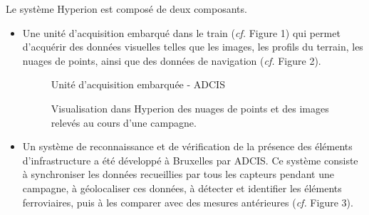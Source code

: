 \noindent Le système Hyperion est composé de deux composants.
\begin{itemize}
    \item Une unité d'acquisition embarqué dans le train (\textit{cf.} Figure 1) qui permet d'acquérir des données visuelles telles que les images, les profils du terrain, les nuages de points, ainsi que des données de navigation (\textit{cf.} Figure 2).
        \begin{figure}[H]
            \centering
            \caption{Unité d'acquisition embarquée - ADCIS \cite{Hyperion-Unité}} 
        \end{figure}
        \begin{figure}[H]
            \centering
            \caption{Visualisation dans Hyperion des nuages de points et des images relevés au cours d'une \gls{campagne}.} 
        \end{figure}
    \item 
Un système de reconnaissance et de vérification de la présence des éléments d'infrastructure a été développé à Bruxelles par ADCIS. Ce système consiste à synchroniser les données recueillies par tous les capteurs pendant une campagne, à géolocaliser ces données, à détecter et identifier les éléments ferroviaires, puis à les comparer avec des mesures antérieures (\textit{cf.} Figure 3). 
    

\end{itemize}
